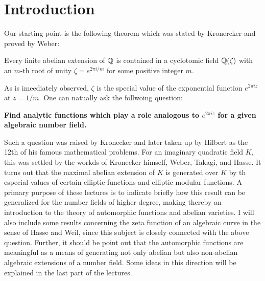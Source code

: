 \section{Introduction}


Our starting point is the following theorem which was stated by Kronercker and proved by Weber:

\begin{theorem}
Every finite abelian extension of $\mathbb{Q}$ is contained in a cyclotomic field $\mathbb{Q}(\zeta)$ with an $m$-th root of unity $\zeta = e^{2\pi i / m}$ for some positive integer $m$.
\end{theorem}

As is imeediately observed, $\zeta$ is the special value of the exponential function $e^{2\pi i z}$ at $z = 1/m$. One can natually ask the follwoing question:

\textbf{Find analytic functions which play a role analogous to $e^{2\pi i z}$ for a given algebraic number field.}

Such a question was raised by Kronecker and later taken up by Hilbert as the 12th of his famous mathematical problems. 
For an imaginary quadratic field $K$, this was settled by the workds of Kronecker himself, Weber, Takagi, and Hasse. It turns out that the maximal abelian extension of $K$ is generated over $K$ by th especial values of certain elliptic functions and elliptic modular functions.
A primary purpose of these lectures is to indicate briefly how this result can be generalized for the number fields of higher degree, making thereby an introduction to the theory of automorphic functions and abelian varieties. I will also include some results concerning the zeta function of an algebraic curve in the sense of Hasse and Weil, since this subject is closely connected with the above question. Further, it should be point out that the automorphic functions are meaningful as a means of generating not only abelian but also non-abelian algebraic extensions of a number field. Some ideas in this direction will be explained in the last part of the lectures.
